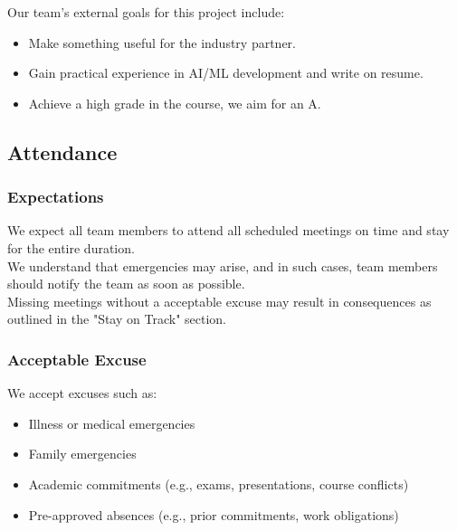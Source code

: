 \documentclass{article}
\begin{document}
Our team's external goals for this project include:
\begin{itemize}
  \item Make something useful for the industry partner.
  \item Gain practical experience in AI/ML development and write on resume.
  \item Achieve a high grade in the course, we aim for an A.
\end{itemize}

\subsection*{Attendance}

\subsubsection*{Expectations}

We expect all team members to attend all scheduled meetings on time and stay for the entire duration. \\
We understand that emergencies may arise, and in such cases, team members should notify the team as soon as possible.\\
Missing meetings without a acceptable excuse may result in consequences as outlined in the "Stay on Track" section.

\subsubsection*{Acceptable Excuse}

We accept excuses such as:
\begin{itemize}
  \item Illness or medical emergencies
  \item Family emergencies
  \item Academic commitments (e.g., exams, presentations, course conflicts)
  \item Pre-approved absences (e.g., prior commitments, work obligations)
\end{itemize}
\end{document}
